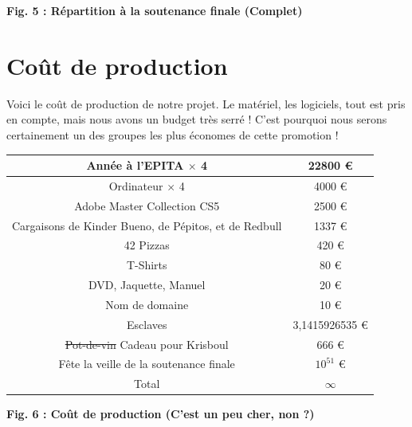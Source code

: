 \documentclass{article}
\begin{document}
\begin{center}
\bf{Fig. 5 : Répartition à la soutenance finale (Complet)}
\end{center}



\newpage
\section{Coût de production}

\par
Voici le coût de production de notre projet. Le matériel, les logiciels, tout est pris en compte, mais nous avons un budget très serré ! C'est pourquoi nous serons certainement un des groupes les plus économes de cette promotion !
\newline

\begin{center}
\begin{tabular}{|c|c|}
\hline
Année à l'EPITA \(\times\) 4 & 22800 \euro \\
\hline
Ordinateur \(\times\) 4 & 4000 \euro \\
\hline
Adobe Master Collection CS5 & 2500 \euro \\
\hline
Cargaisons de Kinder Bueno, de Pépitos, et de Redbull  & 1337 \euro \\
\hline
42 Pizzas & 420 \euro \\
\hline
T-Shirts & 80 \euro \\
\hline
DVD, Jaquette, Manuel & 20 \euro \\
\hline
Nom de domaine & 10 \euro \\
\hline
Esclaves & 3,1415926535 \euro \\
\hline
\st{Pot-de-vin} Cadeau pour Krisboul & 666 \euro \\
\hline
Fête la veille de la soutenance finale & $10^{51}$ \euro \\
\hline
Total & \(\infty\)  \\
\hline
\end{tabular}
\end{center}

\begin{center}
\bf{Fig. 6 : Coût de production (C'est un peu cher, non ?)}
\end{center}

\vspace*{2cm}
\end{document}
